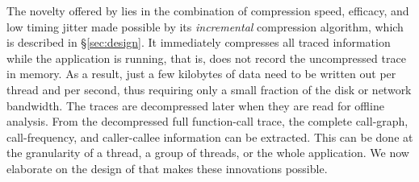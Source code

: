 The novelty offered by \parlot lies in the combination of compression
speed, efficacy, and low timing jitter
made possible by its {\em incremental}
compression algorithm, which is
described in \S\ref{sec:design}.
%
It immediately compresses all traced information while the application is running, that is, \parlot does not record the uncompressed trace in memory. 
%
As a result, just a few kilobytes of data need to be written out per thread and per second, thus requiring only a small fraction of the  disk or network bandwidth. 
%
The traces are decompressed later when they are read for offline analysis.
%
From the decompressed full function-call trace, the complete call-graph, 
call-frequency, and caller-callee information can be extracted. 
%
This can be done at the granularity of a thread, a group of threads, or the whole application.
%
We now elaborate on the design of \parlot that makes
these innovations possible.







